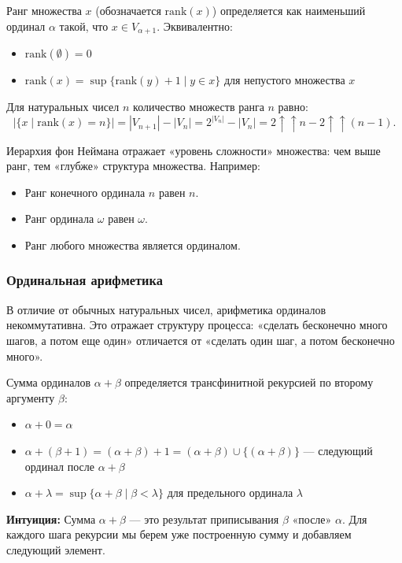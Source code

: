 \documentclass[11pt, a4paper]{extarticle}
\newcommand{\al}{\alpha}
\newcommand{\be}{\beta}
\newcommand{\la}{\lambda}
\newcommand{\om}{\omega}
\newcommand{\rank}{\mathrm{rank}}
\begin{document}
\begin{definition}
Ранг множества $x$ (обозначается $\rank(x)$) определяется как наименьший ординал $\al$ такой, что $x \in V_{\al + 1}$. Эквивалентно:
\begin{itemize}
    \item $\rank(\emptyset) = 0$
    \item $\rank(x) = \sup\{\rank(y) + 1 \mid y \in x\}$ для непустого множества $x$
\end{itemize}

Для натуральных чисел $n$ количество множеств ранга $n$ равно:
$$|\{x \mid \rank(x) = n\}| = |V_{n+1}| - |V_n| = 2^{|V_n|} - |V_n|=2\uparrow\uparrow n-2\uparrow\uparrow (n-1).$$
\end{definition}

\begin{remark}
Иерархия фон Неймана отражает «уровень сложности» множества: чем выше ранг, тем «глубже» структура множества. Например:
\begin{itemize}
    \item Ранг конечного ординала $n$ равен $n$.
    \item Ранг ординала $\om$ равен $\om$.
    \item Ранг любого множества является ординалом.
\end{itemize}
\end{remark}

\subsubsection{Ординальная арифметика}

В отличие от обычных натуральных чисел, арифметика ординалов некоммутативна. Это отражает структуру процесса: «сделать бесконечно много шагов, а потом еще один» отличается от «сделать один шаг, а потом бесконечно много».

\begin{definition}
Сумма ординалов $\al + \be$ определяется трансфинитной рекурсией по второму аргументу $\be$:
\begin{itemize}
    \item $\al + 0 = \al$
    \item $\al + (\be + 1) = (\al + \be) + 1 = (\al + \be) \cup \{(\al + \be)\}$ — следующий ординал после $\al + \be$
    \item $\al + \la = \sup\{\al + \be \mid \be < \la\}$ для предельного ординала $\la$
\end{itemize}

\textbf{Интуиция:} Сумма $\al + \be$ — это результат приписывания $\be$ «после» $\al$. Для каждого шага рекурсии мы берем уже построенную сумму и добавляем следующий элемент.
\end{definition}
\end{document}
